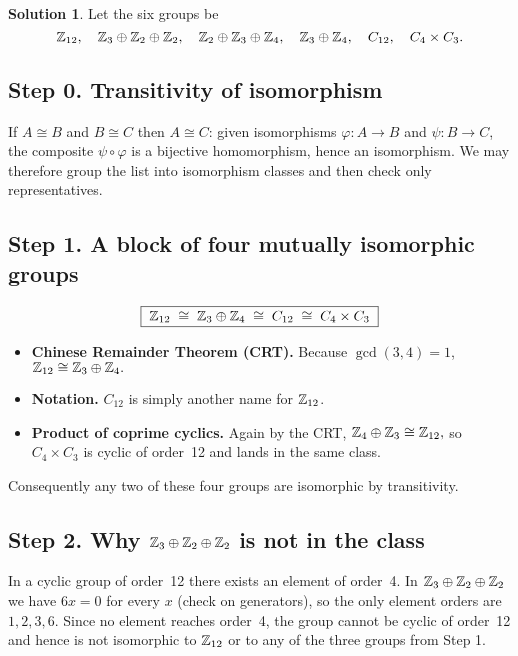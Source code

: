\documentclass[12pt]{article}
\theoremstyle{definition} %
\newtheorem{solution}{Solution}
\theoremstyle{plain} %
\begin{document}
\begin{solution}
  Let the six groups be
  \[
  \Bbb Z_{12},\quad
  \Bbb Z_3\oplus\Bbb Z_2\oplus\Bbb Z_2,\quad
  \Bbb Z_2\oplus\Bbb Z_3\oplus\Bbb Z_4,\quad
  \Bbb Z_3\oplus\Bbb Z_4,\quad
  C_{12},\quad
  C_4\times C_3 .
  \]
  
  \subsection*{Step 0.  Transitivity of isomorphism}
  If \(A\cong B\) and \(B\cong C\) then \(A\cong C\):
  given isomorphisms \(\varphi:A\to B\) and \(\psi:B\to C\),
  the composite \(\psi\circ\varphi\) is a bijective homomorphism, hence an
  isomorphism.  We may therefore group the list into isomorphism classes
  and then check only representatives.
  
  \subsection*{Step 1.  A block of four mutually isomorphic groups}
  \[
  \boxed{\;
    \Bbb Z_{12}\;\cong\;
    \Bbb Z_3\oplus\Bbb Z_4\;\cong\;
    C_{12}\;\cong\;
    C_4\times C_3
  \;}
  \]
  
  \begin{itemize}
    \item \textbf{Chinese Remainder Theorem (CRT).}\;
          Because \(\gcd(3,4)=1\),
          \(
            \Bbb Z_{12}\cong\Bbb Z_{3}\oplus\Bbb Z_{4}.
          \)
    \item \textbf{Notation.}\;
          \(C_{12}\) is simply another name for \(\Bbb Z_{12}\).
    \item \textbf{Product of coprime cyclics.}\;
          Again by the CRT,
          \(
            \Bbb Z_4\oplus\Bbb Z_3\cong\Bbb Z_{12},
          \)
          so \(C_4\times C_3\) is cyclic of order 12 and
          lands in the same class.
  \end{itemize}
  
  Consequently any two of these four groups are isomorphic by
  transitivity.
  
  \subsection*{Step 2.  Why \(\Bbb Z_3\oplus\Bbb Z_2\oplus\Bbb Z_2\) is not in the class}
  
  In a cyclic group of order~12 there exists an element of order~4.
  In \(\Bbb Z_3\oplus\Bbb Z_2\oplus\Bbb Z_2\) we have \(6x=0\) for every
  \(x\) (check on generators), so the only element orders are
  \(1,2,3,6\).
  Since no element reaches order 4, the group cannot be cyclic of
  order 12 and hence is not isomorphic to \(\Bbb Z_{12}\) or to any of
  the three groups from Step 1.
  

\end{solution}
\end{document}
